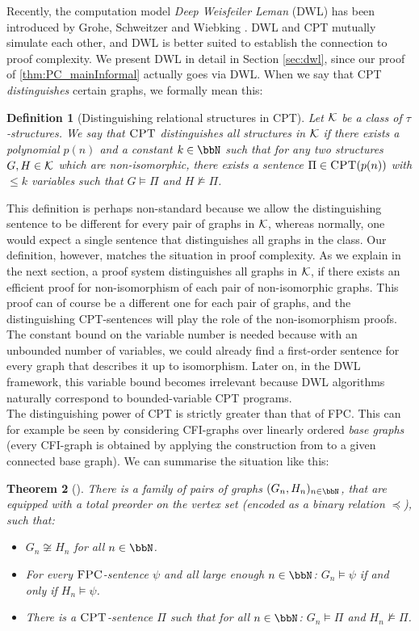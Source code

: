 \documentclass[10pt,a4paper]{article}
\newtheorem{theorem}{Theorem}
\newtheorem{definition}[theorem]{Definition}
\newcommand{\FPC}{\mbox{\sc FPC}}
\newcommand{\CPT}{\mbox{\sc CPT}}
\newcommand{\G}{\ensuremath{\mathfrak{G}}}
\newcommand{\Kk}{{\cal K}}
\renewcommand{\G}{G} %
\begin{document}
	Recently, the computation model \emph{Deep Weisfeiler Leman} (DWL) has been introduced by Grohe, Schweitzer and Wiebking \cite{dwl}. DWL and CPT mutually simulate each other, and DWL is better suited to establish the connection to proof complexity.
	We present DWL in detail in Section \ref{sec:dwl}, since our proof of \autoref{thm:PC_mainInformal} actually goes via DWL.
	When we say that CPT \emph{distinguishes} certain graphs, we formally mean this:
	\begin{definition}[Distinguishing relational structures in CPT]
		\label{def:distinguishingInCPT}
		Let $\Kk$ be a class of $\tau$-structures. We say that $\CPT$ distinguishes all structures in $\Kk$ if there exists a polynomial $p(n)$ and a constant $k \in \bbN$ such that for any two structures $G, H \in \Kk$ which are non-isomorphic, there exists a sentence $\Pi \in \CPT(p(n))$ with $\leq k$ variables such that $G \models \Pi$ and $H \not\models \Pi$. 
	\end{definition}	
	This definition is perhaps non-standard because we allow the distinguishing sentence to be different for every pair of graphs in $\Kk$, whereas normally, one would expect a single sentence that distinguishes all graphs in the class. Our definition, however, matches the situation in proof complexity. As we explain in the next section, a proof system distinguishes all graphs in $\Kk$, if there exists an efficient proof for non-isomorphism of each pair of non-isomorphic graphs. This proof can of course be a different one for each pair of graphs, and the distinguishing CPT-sentences will play the role of the non-isomorphism proofs. The constant bound on the variable number is needed because with an unbounded number of variables, we could already find a first-order sentence for every graph that describes it up to isomorphism. Later on, in the DWL framework, this variable bound becomes irrelevant because DWL algorithms naturally correspond to bounded-variable CPT programs.\\
	
	The distinguishing power of CPT is strictly greater than that of FPC. This can for example be seen by considering CFI-graphs over linearly ordered \emph{base graphs} (every CFI-graph is obtained by applying the construction from \cite{caifurimm92} to a given connected base graph). We can summarise the situation like this:
	\begin{theorem}[\cite{dawar2008}]
		\label{thm:separationCPTandFPC}
		There is a  family of pairs of graphs $(G_n,H_n)_{n \in \bbN}$, that are equipped with a total preorder on the vertex set (encoded as a binary relation $\preceq$), such that:
		\begin{itemize}
			\item $G_n \not\cong H_n$ for all $n \in \bbN$. 
			\item For every $\FPC$-sentence $\psi$ and all large enough $n \in \bbN$: $\G_n \models \psi$ if and only if $H_n \models \psi$.
			\item There is a $\CPT$-sentence $\Pi$ such that for all $n \in \bbN$: $G_n \models \Pi$ and $H_n \not\models \Pi$.
		\end{itemize}	
	\end{theorem}	
\end{document}
